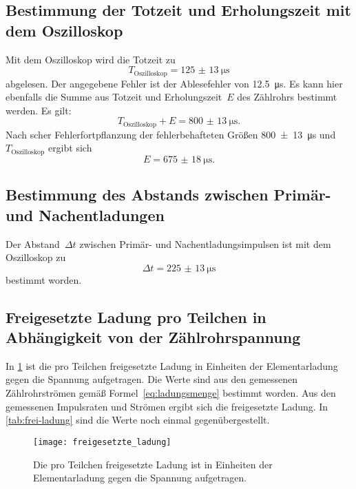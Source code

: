 \subsection{Bestimmung der Totzeit und Erholungszeit mit dem Oszilloskop}

Mit dem Oszilloskop wird die Totzeit zu
\begin{equation}
  T_\text{Oszilloskop} = \SI{125(13)}{\micro\second}
\end{equation}
abgelesen. Der angegebene Fehler ist der Ablesefehler von
\SI{12.5}{\micro\second}. Es kann hier ebenfalls die Summe aus Totzeit
und Erholungszeit~$E$ des Zählrohrs bestimmt werden. Es gilt:
\begin{equation}
  T_\text{Oszilloskop} + E = \SI{800(13)}{\micro\second}.
\end{equation}
Nach scher Fehlerfortpflanzung der fehlerbehafteten Größen
\SI{800(13)}{\micro\second} und $T_\text{Oszilloskop}$ ergibt sich
\begin{equation}
    E = \SI{675(18)}{\micro\second}.
\end{equation}

\subsection{Bestimmung des Abstands zwischen Primär- und
  Nachentladungen}

Der Abstand~$\Delta t$ zwischen Primär- und Nachentladungsimpulsen ist mit dem
Oszilloskop zu
%
\begin{equation}
  \Delta t = \SI{225(13)}{\micro\second}
\end{equation}
%
bestimmt worden.

\subsection{Freigesetzte Ladung pro Teilchen in Abhängigkeit von der
  Zählrohrspannung}

In \cref{fig:freigesetzte_ladung} ist die pro Teilchen freigesetzte
Ladung in Einheiten der Elementarladung gegen die Spannung aufgetragen.
Die Werte sind aus den gemessenen Zählrohrströmen gemäß
Formel~\eqref{eq:ladungsmenge} bestimmt worden. Aus den gemessenen
Impulsraten und Strömen ergibt sich die freigesetzte Ladung. In
\cref{tab:frei-ladung} sind die Werte noch einmal gegenübergestellt.

\begin{figure}
  \centering
  \texttt{[image: freigesetzte\_ladung]}
    \caption{Die pro Teilchen freigesetzte Ladung ist in Einheiten der
      Elementarladung gegen die Spannung aufgetragen.}
  \label{fig:freigesetzte_ladung}
\end{figure}

